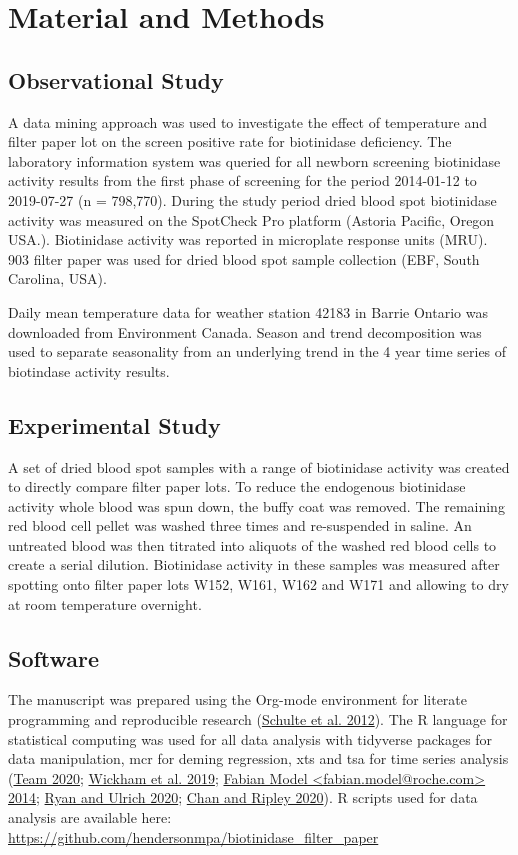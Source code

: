 \documentclass[review]{elsarticle}
\begin{document}
\section*{Material and Methods}
\label{sec:org2da43c7}
\subsection*{Observational Study}
\label{sec:orgab91694}
A data mining approach was used to investigate the effect of
temperature and filter paper lot on the screen positive rate for
biotinidase deficiency. The laboratory information system was queried
for all newborn screening biotinidase activity results from the first
phase of screening for the period 2014-01-12 to 2019-07-27 (n =
798,770). During the study period dried blood spot biotinidase
activity was measured on the SpotCheck Pro platform (Astoria Pacific,
Oregon USA.). Biotinidase activity was reported in microplate response
units (MRU). 903 filter paper was used for dried blood spot sample
collection (EBF, South Carolina, USA).

Daily mean temperature data for weather station 42183 in Barrie
Ontario was downloaded from Environment Canada. Season and trend
decomposition was used to separate seasonality from an underlying
trend in the 4 year time series of biotindase activity results.

\subsection*{Experimental Study}
\label{sec:orgbafda80}

A set of dried blood spot samples with a range of biotinidase activity
was created to directly compare filter paper lots. To reduce the
endogenous biotinidase activity whole blood was spun down, the buffy
coat was removed. The remaining red blood cell pellet was washed three
times and re-suspended in saline. An untreated blood was then titrated
into aliquots of the washed red blood cells to create a serial
dilution. Biotinidase activity in these samples was measured after
spotting onto filter paper lots W152, W161, W162 and W171 and allowing
to dry at room temperature overnight.

\subsection*{Software}
\label{sec:org61f9808}
The manuscript was prepared using the Org-mode environment for
literate programming and reproducible research (\hyperlink{citeproc_bib_item_9}{Schulte et al. 2012}). The R language for statistical computing was used
for all data analysis with tidyverse packages for data manipulation,
mcr for deming regression, xts and tsa for time series analysis (\hyperlink{citeproc_bib_item_11}{Team 2020}; \hyperlink{citeproc_bib_item_14}{Wickham et al. 2019}; \hyperlink{citeproc_bib_item_4}{Fabian Model <fabian.model@roche.com> 2014}; \hyperlink{citeproc_bib_item_8}{Ryan and Ulrich 2020}; \hyperlink{citeproc_bib_item_3}{Chan and Ripley 2020}). R scripts used for data
analysis are available here:
\url{https://github.com/hendersonmpa/biotinidase\_filter\_paper}
\end{document}
